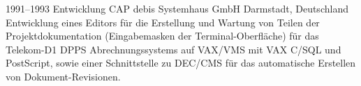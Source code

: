 \cventry
{1991--1993}
{Entwicklung}
{}
{CAP debis Systemhaus GmbH}
{Darmstadt, Deutschland}
{
  Entwicklung eines Editors für die Erstellung und Wartung von Teilen der Projektdokumentation
  (Eingabemasken der Terminal-Oberfläche) für das Telekom-D1 DPPS Abrechnungssystems auf VAX/VMS mit
  VAX C/SQL und PostScript, sowie einer Schnittstelle zu DEC/CMS für das automatische Erstellen
  von Dokument-Revisionen.
}
